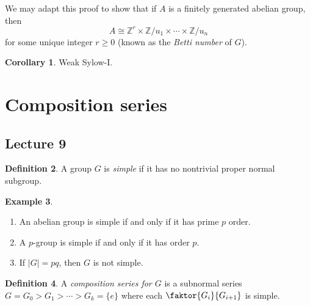 \documentclass[10pt,letterpaper,cm]{nupset}
\theoremstyle{definition}
\newtheorem{definition}{Definition}[subsection]
\newtheorem{exmp}[definition]{Example}
\theoremstyle{theorem}
\newtheorem{corollary}[definition]{Corollary}
\theoremstyle{remark}
\newcommand{\Z}{\mathbb Z}
\newcommand{\1}{\mathbf{1}}
\newcommand{\0}{\vec 0}
\begin{document}
We may adapt this proof to show that if $A$ is a finitely generated abelian group, then $$A \cong \Z^r \times \Z/u_1 \times \cdots \times \Z/u_n$$ for some unique integer $r\geq 0$ (known as the \textit{Betti number} of $G$). 

\smallskip

\begin{corollary}
Weak Sylow-I.
\end{corollary}


\section{Composition series}

\subsection{Lecture 9}

\begin{definition}
A group $G$ is \textit{simple} if it has no nontrivial proper normal subgroup.
\end{definition}

\begin{exmp} $ $
\begin{enumerate}
\item An abelian group is simple if and only if it has prime $p$ order.
\item A $p$-group is simple if and only if it has order $p$.
\item If $\lvert{G}\rvert = pq$, then $G$ is not simple.
\end{enumerate}
\end{exmp}

\begin{definition}
A \textit{composition series for $G$} is a subnormal series $G = G_0 > G_1 > \cdots > G_k = \{e\}$ where each $\faktor{G_i}{G_{i+1}}$ is simple.
\end{definition}
\end{document}

